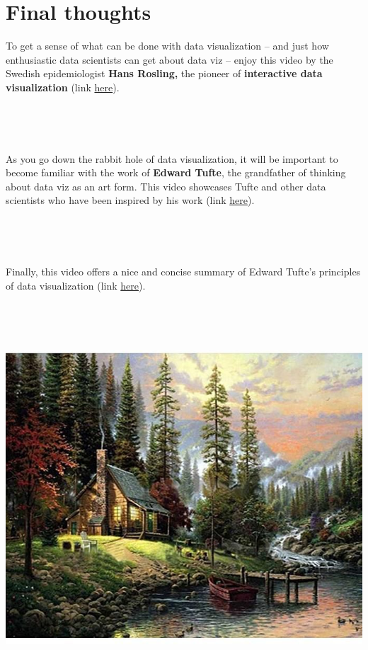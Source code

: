 \documentclass[
]{book}
\begin{document}
\hypertarget{final-thoughts}{%
\section*{Final thoughts}\label{final-thoughts}}

To get a sense of what can be done with data visualization -- and just how enthusiastic data scientists can get about data viz -- enjoy this video by the Swedish epidemiologist \textbf{Hans Rosling,} the pioneer of \textbf{interactive data visualization} (link \href{https://www.youtube.com/watch?v=jbkSRLYSojo\&t=2s}{here}).

~

~

As you go down the rabbit hole of data visualization, it will be important to become familiar with the work of \textbf{Edward Tufte}, the grandfather of thinking about data viz as an art form. This video showcases Tufte and other data scientists who have been inspired by his work (link \href{https://www.youtube.com/watch?v=AdSZJzb-aX8}{here}).

~

~

Finally, this video offers a nice and concise summary of Edward Tufte's principles of data visualization (link \href{https://www.youtube.com/watch?v=r7YdcZkS_1k}{here}).

~

~\\
\hspace*{0.333em}

\includegraphics{img/vis-painting.jpeg}
\end{document}
